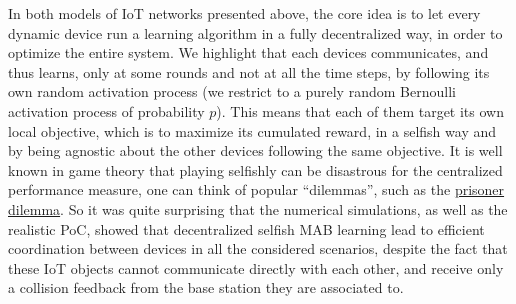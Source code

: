 %
In both models of IoT networks presented above, the core idea is to let every dynamic device run a learning algorithm in a fully decentralized way, in order to optimize the entire system.
We highlight that each devices communicates, and thus learns, only at some rounds and not at all the time steps, by following its own random activation process (we restrict to a purely random Bernoulli activation process of probability $p$).
This means that each of them target its own local objective, which is to maximize its cumulated reward, in a selfish way and by being agnostic about the other devices following the same objective.
It is well known in game theory that playing selfishly can be disastrous for the centralized performance measure, one can think of popular ``dilemmas'', such as the \href{https://en.wikipedia.org/wiki/Prisoner%27s_dilemma}{prisoner dilemma}.
So it was quite surprising that the numerical simulations, as well as the realistic PoC, showed that decentralized selfish MAB learning lead to efficient coordination between devices in all the considered scenarios, despite the fact that these IoT objects cannot communicate directly with each other, and receive only a collision feedback from the base station they are associated to.

